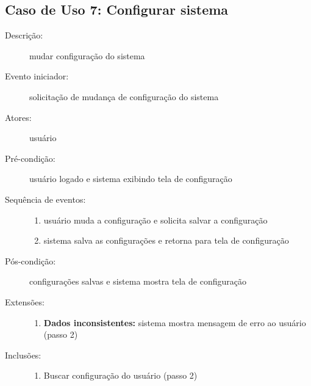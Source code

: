 \subsection{Caso de Uso 7: Configurar sistema}
\begin{description}
	\item[Descrição:] mudar configuração do sistema
	\item[Evento iniciador:] solicitação de mudança de configuração do sistema
	\item[Atores:] usuário
	\item[Pré-condição:] usuário logado e sistema exibindo tela de configuração
	\item[Sequência de eventos:] \hfill
		\begin{enumerate}
			\item{usuário muda a configuração e solicita salvar a configuração}
			\item{sistema salva as configurações e retorna para tela de configuração}
		\end{enumerate}
	\item[Pós-condição:] configurações salvas e sistema mostra tela de configuração
	\item[Extensões:] \hfill
		\begin{enumerate}
			\item{\textbf{Dados inconsistentes:} sistema mostra mensagem de erro ao usuário (passo 2)}
		\end{enumerate}
	\item[Inclusões:] \hfill
		\begin{enumerate}
			\item{Buscar configuração do usuário (passo 2)}
		\end{enumerate}
\end{description}